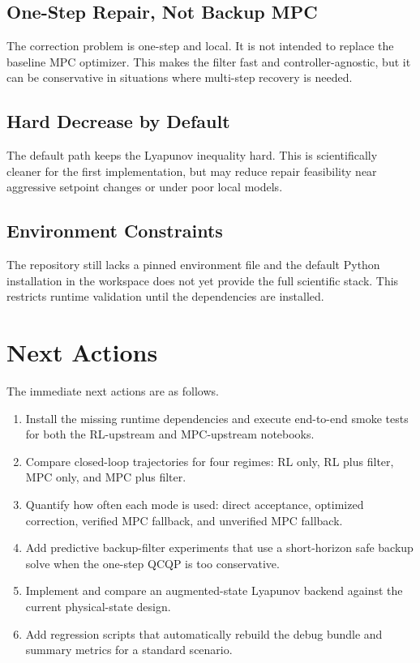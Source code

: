 \documentclass[11pt]{article}
\begin{document}
\subsection{One-Step Repair, Not Backup MPC}
The correction problem is one-step and local. It is not intended to replace the baseline MPC optimizer. This makes the filter fast and controller-agnostic, but it can be conservative in situations where multi-step recovery is needed.

\subsection{Hard Decrease by Default}
The default path keeps the Lyapunov inequality hard. This is scientifically cleaner for the first implementation, but may reduce repair feasibility near aggressive setpoint changes or under poor local models.

\subsection{Environment Constraints}
The repository still lacks a pinned environment file and the default Python installation in the workspace does not yet provide the full scientific stack. This restricts runtime validation until the dependencies are installed.

\section{Next Actions}
The immediate next actions are as follows.
\begin{enumerate}[leftmargin=*]
\item Install the missing runtime dependencies and execute end-to-end smoke tests for both the RL-upstream and MPC-upstream notebooks.
\item Compare closed-loop trajectories for four regimes: RL only, RL plus filter, MPC only, and MPC plus filter.
\item Quantify how often each mode is used: direct acceptance, optimized correction, verified MPC fallback, and unverified MPC fallback.
\item Add predictive backup-filter experiments that use a short-horizon safe backup solve when the one-step QCQP is too conservative.
\item Implement and compare an augmented-state Lyapunov backend against the current physical-state design.
\item Add regression scripts that automatically rebuild the debug bundle and summary metrics for a standard scenario.
\end{enumerate}
\end{document}

